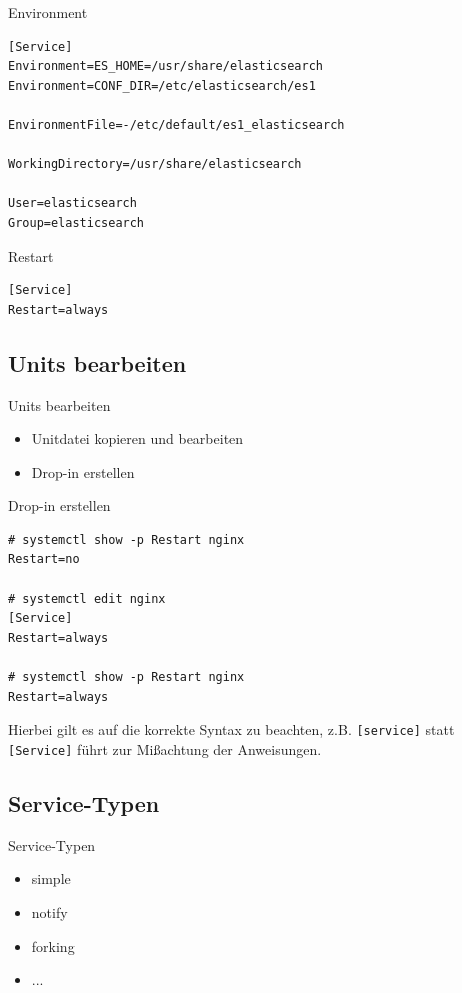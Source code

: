 \begin{frame}[fragile]{Environment}
\begin{lstlisting}
[Service]	
Environment=ES_HOME=/usr/share/elasticsearch
Environment=CONF_DIR=/etc/elasticsearch/es1

EnvironmentFile=-/etc/default/es1_elasticsearch

WorkingDirectory=/usr/share/elasticsearch

User=elasticsearch
Group=elasticsearch
\end{lstlisting}
\end{frame}

\begin{frame}[fragile]{Restart}
\begin{lstlisting}
[Service]	
Restart=always
\end{lstlisting}
\end{frame}

\subsection{Units bearbeiten}
\begin{frame}{Units bearbeiten}
  \begin{itemize}
    \item Unitdatei kopieren und bearbeiten
    \item Drop-in erstellen
  \end{itemize}
\end{frame}

\begin{frame}[fragile]{Drop-in erstellen}
	\begin{lstlisting}
# systemctl show -p Restart nginx
Restart=no

# systemctl edit nginx
[Service]
Restart=always

# systemctl show -p Restart nginx
Restart=always
\end{lstlisting}
\end{frame}

Hierbei gilt es auf die korrekte Syntax zu beachten, z.B. \verb|[service]| statt \verb|[Service]|
führt zur Mißachtung der Anweisungen.

\subsection{Service-Typen}

\begin{frame}{Service-Typen}
\begin{itemize}
\item simple
\item notify
\item forking
\item ...
\end{itemize}
\end{frame}

